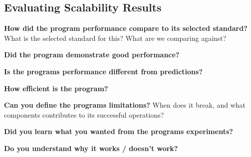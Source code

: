 \subsection{Evaluating Scalability Results}

\textbf{How did the program performance compare to its selected standard?}
What is the selected standard for this? What are we comparing against?

\textbf{Did the program demonstrate good performance?}

\textbf{Is the programs performance different from predictions?}

\textbf{How efficient is the program?}

\textbf{Can you define the programs limitations?}
When does it break, and what components contributes to its successful operations?

\textbf{Did you learn what you wanted from the programs experiments?}

\textbf{Do you understand why it works / doesn't work?}

